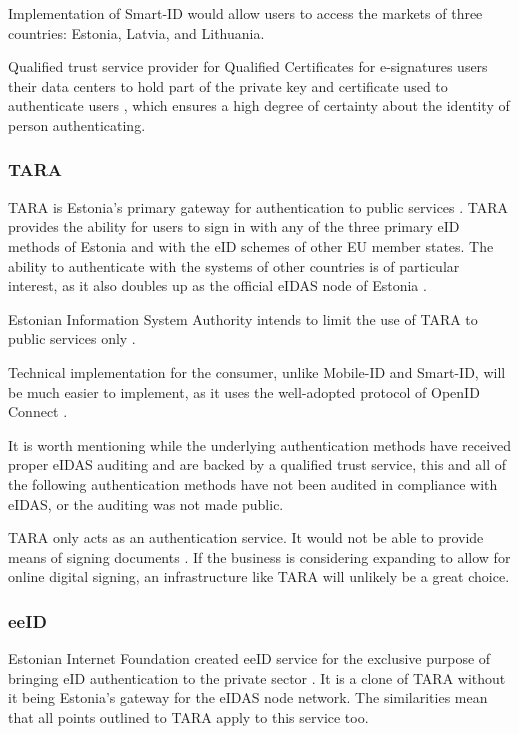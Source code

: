 Implementation of Smart-ID would allow users to access the markets of three countries: Estonia, Latvia, and Lithuania.

Qualified trust service provider for Qualified Certificates for e-signatures users their data centers to hold part of the private key and certificate used to authenticate users \cite{eu-trustservices}, which ensures a high degree of certainty about the identity of person authenticating.

\subsubsection{TARA}

TARA is Estonia's primary gateway for authentication to public services \cite{tara}. TARA provides the ability for users to sign in with any of the three primary eID methods of Estonia and with the eID schemes of other EU member states. The ability to authenticate with the systems of other countries is of particular interest, as it also doubles up as the official eIDAS node of Estonia \cite{tara}.

Estonian Information System Authority intends to limit the use of TARA to public services only \cite{tara-business}.

Technical implementation for the consumer, unlike Mobile-ID and Smart-ID, will be much easier to implement, as it uses the well-adopted protocol of OpenID Connect \cite{tara-technical, oidc}.

It is worth mentioning while the underlying authentication methods have received proper eIDAS auditing and are backed by a qualified trust service, this and all of the following authentication methods have not been audited in compliance with eIDAS, or the auditing was not made public.

TARA only acts as an authentication service. It would not be able to provide means of signing documents \cite{tara-technical}. If the business is considering expanding to allow for online digital signing, an infrastructure like TARA will unlikely be a great choice.

\subsubsection{eeID}

Estonian Internet Foundation created eeID service for the exclusive purpose of bringing eID authentication to the private sector \cite{eeid}. It is a clone of TARA without it being Estonia's gateway for the eIDAS node network. The similarities mean that all points outlined to TARA apply to this service too.

